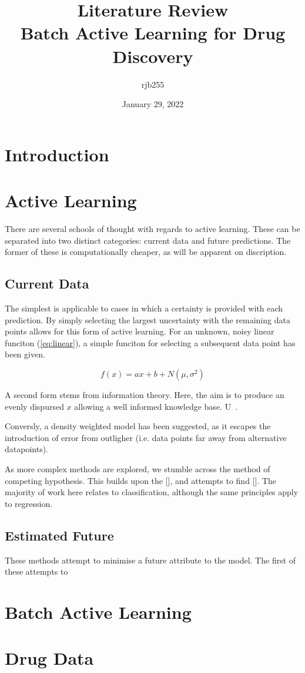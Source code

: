 \documentclass[a4paper, british]{article}
\begin{document}
\title{\Large{\textbf{Literature Review}}\\Batch Active Learning for Drug Discovery}
\author{rjb255}
\date{January 29, 2022}

\maketitle

\begin{abstract}

\end{abstract}

\section{Introduction}

\section{Active Learning}
There are several schools of thought with regards to active learning. These can be separated into two distinct categories: current data and future predictions. The former of these is computationally cheaper, as will be apparent on discription.

\subsection{Current Data}
The simplest is applicable to cases in which a certainty is provided with each prediction. By simply selecting the largest uncertainty with the remaining data points allows for this form of active learning. For an unknown, noisy linear funciton (\ref{eq:linear}), a simple funciton for selecting a subsequent data point has been given.

\begin{equation}
    \label{eq:linear}
    f(x)=a x+b + N(\mu, \sigma^2)
\end{equation}

A second form stems from information theory. Here, the aim is to produce an evenly dispursed $x$ allowing a well informed knowledge base. U~\cite{Eisenstein_2020}.

Conversly, a density weighted model has been suggested, as it escapes the introduction of error from outligher (i.e. data points far away from alternative datapoints).

As more complex methods are explored, we stumble across the method of competing hypothesis. This builds upon the [], and attempts to find []. The majority of work here relates to classification, although the same principles apply to regression.
\subsection{Estimated Future}
These methods attempt to minimise a future attribute to the model. The first of these attempts to
\section{Batch Active Learning}

\section{Drug Data}
\printbibliography{}
\end{document}
